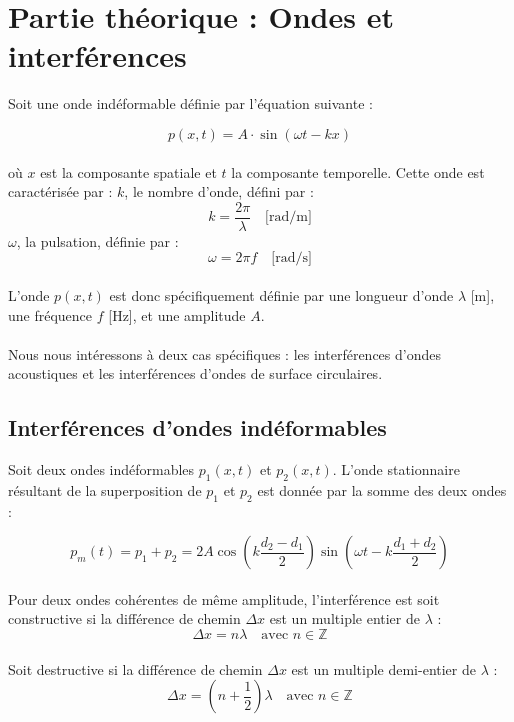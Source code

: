 \section{Partie théorique : Ondes et interférences}
\label{sec:theorie}

Soit une onde indéformable définie par l'équation suivante :

\begin{equation}
    p(x,t) = A \cdot \sin(\omega t - kx)
    \label{eq:onde}
\end{equation}
\\
où \(x\) est la composante spatiale et \(t\) la composante temporelle. Cette onde est caractérisée par :
   \(k\), le nombre d'onde, défini par :
    \begin{equation}
        k = \frac{2\pi}{\lambda} \quad \text{[rad/m]}
        \label{eq:k}
    \end{equation}
    \(\omega\), la pulsation, définie par :
    \begin{equation}
        \omega = 2\pi f \quad \text{[rad/s]}
        \label{eq:omega}
    \end{equation}
\\
L'onde \(p(x,t)\) est donc spécifiquement définie par une longueur d'onde \(\lambda\) [m], une fréquence \(f\) [Hz], et une amplitude \(A\).
\\\\
Nous nous intéressons à deux cas spécifiques : les interférences d'ondes acoustiques et les interférences d'ondes de surface circulaires.

\subsection{Interférences d'ondes indéformables}
\label{subsec:interferences}

Soit deux ondes indéformables \(p_1(x,t)\) et \(p_2(x,t)\). L'onde stationnaire résultant de la superposition de \(p_1\) et \(p_2\) est donnée par la somme des deux ondes :

\begin{equation}
    p_m(t) = p_1 + p_2 = 2A \cos\left(k \frac{d_2 - d_1}{2}\right) \sin\left(\omega t - k \frac{d_1 + d_2}{2}\right)
    \label{eq:station}
\end{equation}
\\
Pour deux ondes cohérentes de même amplitude, l'interférence est soit constructive si la différence de chemin \(\Delta x\) est un multiple entier de \(\lambda\) :
    \begin{equation}
        \Delta x = n \lambda \quad \text{avec } n \in \mathbb{Z}
        \label{eq:constructive}
    \end{equation}
    \\Soit destructive si la différence de chemin \(\Delta x\) est un multiple demi-entier de \(\lambda\) :
    \begin{equation}
        \Delta x = \left(n + \frac{1}{2}\right) \lambda \quad \text{avec } n \in \mathbb{Z}
        \label{eq:destructive}
    \end{equation}

